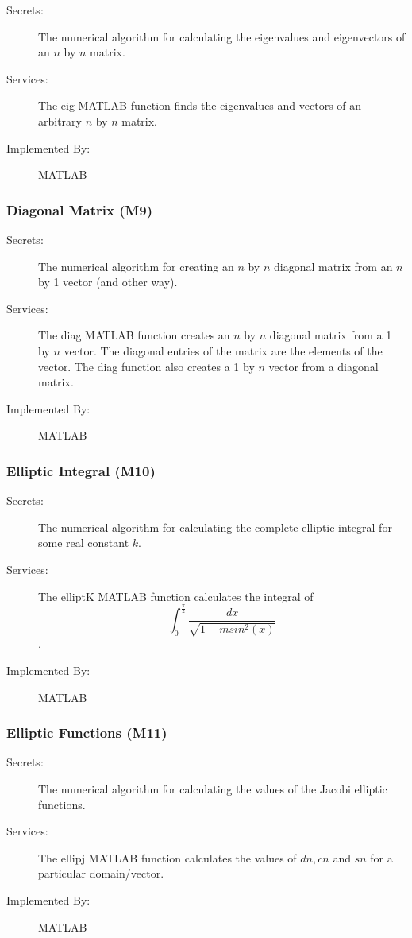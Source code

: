 \documentclass[12pt, titlepage]{article}
\begin{document}
\begin{description}
	\item[Secrets:] The numerical algorithm for calculating the eigenvalues and 
	eigenvectors of an 
	$n$ by $n$ matrix.
	\item[Services:] The eig MATLAB function finds the eigenvalues and vectors 
	of an 
	arbitrary $n$ by $n$ matrix.
	\item[Implemented By:] MATLAB
\end{description} 

\subsubsection{Diagonal Matrix (M9)} 

\begin{description}
	\item[Secrets:] The numerical algorithm for creating an $n$ by $n$ diagonal 
	matrix from an $n$ by 1 vector (and other way). 
	\item[Services:] The diag MATLAB function creates an $n$ by $n$ diagonal 
	matrix 
	from a 1 by $n$ vector. The diagonal entries of the matrix are the elements 
	of the vector. The 
	diag function also creates a 1 by $n$ vector from a diagonal matrix.
	\item[Implemented By:] MATLAB
\end{description} 

\subsubsection{Elliptic Integral (M10)} 

\begin{description}
	\item[Secrets:] The numerical algorithm for calculating the complete 
	elliptic integral for some real constant $k$. 
	\item[Services:] The elliptK MATLAB function calculates the integral of $$ 
	\int_{0}^{\frac{\pi}{2}} \frac{dx}{\sqrt{1-msin^{2}(x)}}$$. \\ 
	\item[Implemented By:] MATLAB
\end{description} 

\subsubsection{Elliptic Functions (M11)} 

\begin{description}
	\item[Secrets:] The numerical algorithm for calculating the values of the 
	Jacobi elliptic functions. 
	\item[Services:] The ellipj MATLAB function calculates the values of 
	$dn,cn$ 
	and $sn$ for a particular domain/vector. 
	\item[Implemented By:] MATLAB
\end{description} 
\end{document}
